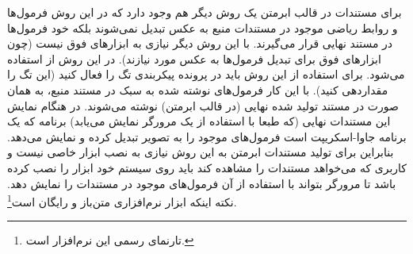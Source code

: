 برای مستندات در قالب ابرمتن یک روش دیگر هم وجود دارد که در این روش فرمول‌ها
و روابط ریاضی موجود در مستندات منبع به عکس تبدیل نمی‌شوند بلکه خود فرمول‌ها
در مستند نهایی قرار می‌گیرند. با این روش دیگر نیازی به ابزارهای فوق نیست (چون
ابزارهای فوق برای تبدیل فرمول‌ها به عکس مورد نیازند). در این روش از 
استفاده می‌شود. برای استفاده از این روش باید در پرونده پیکربندی  تگ
 را فعال کنید (این تگ را  مقداردهی کنید). با این کار
فرمول‌های نوشته شده به سبک \lr{\LaTeX} در مستند منبع، به همان صورت در مستند
تولید شده نهایی (در قالب ابرمتن) نوشته می‌شوند. در هنگام نمایش این مستندات نهایی
(که طبعا با استفاده از یک مرورگر نمایش می‌یابد) برنامه  که
یک برنامه جاوا-اسکریپت است فرمول‌های موجود را به تصویر تبدیل کرده و
نمایش می‌دهد. بنابراین برای تولید مستندات ابرمتن به این روش نیازی به نصب ابزار خاصی
نیست و کاربری که می‌خواهد مستندات را مشاهده کند باید روی سیستم خود ابزار
 را نصب کرده باشد تا مرورگر بتواند با استفاده از آن فرمول‌های موجود
در مستندات را نمایش دهد. نکته اینکه ابزار  نرم‌افزاری متن‌باز و
رایگان است\footnote{تارنمای رسمی این نرم‌افزار 
است.}.
